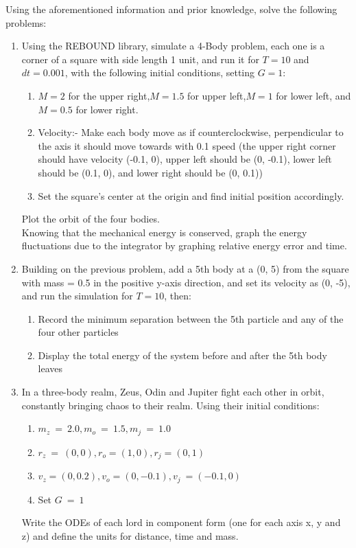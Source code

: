 \documentclass[12pt]{article}
\begin{document}
Using the aforementioned information and prior knowledge, solve the following problems:
\begin{enumerate}
    \item 	Using the REBOUND library, simulate a 4-Body problem, each one is a corner of a square with side length 1 unit, and run it for $T = 10$ and $dt = 0.001$, with the following initial conditions, setting $G = 1$:
    \begin{enumerate}
        \item 	$M = 2$ for the upper right,$ M=1.5$ for upper left,$ M = 1$ for lower left, and $M = 0.5$ for lower right.
        \item 	Velocity:- Make each body move as if counterclockwise, perpendicular to the axis it should move towards with 0.1 speed (the upper right corner should have velocity (-0.1, 0), upper left should be (0, -0.1), lower left should be (0.1, 0), and lower right should be (0, 0.1))
        \item 	Set the square’s center at the origin and find initial position accordingly.
    \end{enumerate}
    Plot the orbit of the four bodies.\\
    Knowing that the mechanical energy is conserved, graph the energy fluctuations due to the integrator by graphing relative energy error and time.

    \item 	Building on the previous problem, add a 5th body at a (0, 5) from the square with mass = 0.5 in the positive y-axis direction, and set its velocity as (0, -5), and run the simulation for $T=10$, then:
    \begin{enumerate}
        \item Record the minimum separation between the 5th particle and any of the four other particles
        \item Display the total energy of the system before and after the 5th body leaves
    \end{enumerate}

    \item In a three-body realm, Zeus, Odin and Jupiter fight each other in orbit, constantly bringing chaos to their realm. Using their initial conditions:
    \begin{enumerate}
        \item $	m_z\ =\ 2.0, m_o\ =\ 1.5, m_j\ =\ 1.0$
        \item $	r_z\ =\ (0,0), r_o = (1,0), r_j = (0,1)$
        \item $	v_z = (0,0.2), v_o = (0,-0.1), v_j\ = (-0.1,0)$
        \item 	Set $G\ =\ 1 $
    \end{enumerate}
    Write the ODEs of each lord in component form (one for each axis x, y and z)  and define the units for distance, time and mass. 


\end{enumerate}
\end{document}
